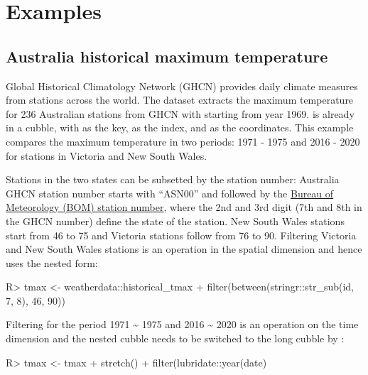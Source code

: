 \documentclass[
]{jss}
\begin{document}
\hypertarget{examples}{%
\section{Examples}\label{examples}}

\hypertarget{australia-historical-maximum-temperature}{%
\subsection{Australia historical maximum
temperature}\label{australia-historical-maximum-temperature}}

Global Historical Climatology Network (GHCN) provides daily climate
measures from stations across the world. The dataset
 extracts the maximum temperature for
236 Australian stations from GHCN with starting from year 1969.
 is already in a cubble, with
 as the key,  as the index, and
 as the coordinates. This example compares
the maximum temperature in two periods: 1971 - 1975 and 2016 - 2020 for
stations in Victoria and New South Wales.

Stations in the two states can be subsetted by the station number:
Australia GHCN station number starts with ``ASN00'' and followed by the
\href{http://www.bom.gov.au/climate/cdo/about/site-num.shtml}{Bureau of
Meteorology (BOM) station number}, where the 2nd and 3rd digit (7th and
8th in the GHCN number) define the state of the station. New South Wales
stations start from 46 to 75 and Victoria stations follow from 76 to 90.
Filtering Victoria and New South Wales stations is an operation in the
spatial dimension and hence uses the nested form:

\begin{CodeChunk}
\begin{CodeInput}
R> tmax <- weatherdata::historical_tmax %
+   filter(between(stringr::str_sub(id, 7, 8), 46, 90))
\end{CodeInput}
\end{CodeChunk}

Filtering for the period 1971 \textasciitilde{} 1975 and 2016
\textasciitilde{} 2020 is an operation on the time dimension and the
nested cubble needs to be switched to the long cubble by
:

\begin{CodeChunk}
\begin{CodeInput}
R> tmax <- tmax %
+   stretch() %
+   filter(lubridate::year(date) %
\end{CodeInput}
\end{CodeChunk}
\end{document}
